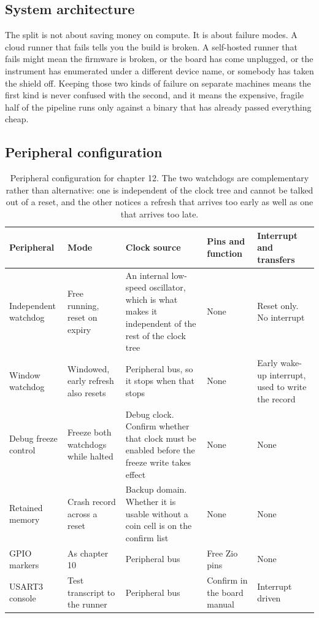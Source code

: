 \subsection*{System architecture}


The split is not about saving money on compute. It is about failure modes. A
cloud runner that fails tells you the build is broken. A self-hosted runner that
fails might mean the firmware is broken, or the board has come unplugged, or the
instrument has enumerated under a different device name, or somebody has taken
the shield off. Keeping those two kinds of failure on separate machines means
the first kind is never confused with the second, and it means the expensive,
fragile half of the pipeline runs only against a binary that has already passed
everything cheap.

\subsection*{Peripheral configuration}

\begin{table}[H]\centering\small
\begin{tabular}{p{22mm}p{26mm}p{24mm}p{30mm}p{30mm}}
\toprule
Peripheral & Mode & Clock source & Pins and function & Interrupt and transfers \\
\midrule
Independent watchdog & Free running, reset on expiry & An internal low-speed oscillator, which is what makes it independent of the rest of the clock tree & None & Reset only. No interrupt \\
Window watchdog & Windowed, early refresh also resets & Peripheral bus, so it stops when that stops & None & Early wake-up interrupt, used to write the record \\
Debug freeze control & Freeze both watchdogs while halted & Debug clock. Confirm whether that clock must be enabled before the freeze write takes effect & None & None \\
Retained memory & Crash record across a reset & Backup domain. Whether it is usable without a coin cell is on the confirm list & None & None \\
GPIO markers & As chapter 10 & Peripheral bus & Free Zio pins & None \\
USART3 console & Test transcript to the runner & Peripheral bus & Confirm in the board manual & Interrupt driven \\
\bottomrule
\end{tabular}
\caption{Peripheral configuration for chapter 12. The two watchdogs are complementary rather than alternative: one is independent of the clock tree and cannot be talked out of a reset, and the other notices a refresh that arrives too early as well as one that arrives too late.}
\end{table}

